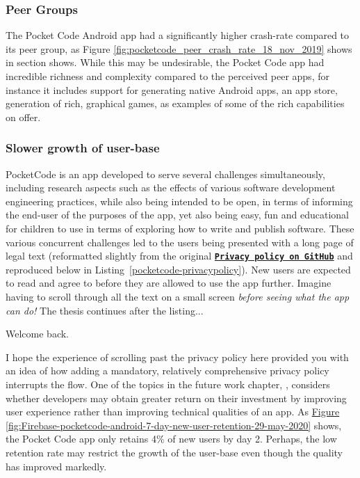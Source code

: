 \subsubsection{Peer Groups}
The Pocket Code Android app had a significantly higher crash-rate compared to its peer group, as Figure \ref{fig:pocketcode_peer_crash_rate_18_nov_2019} shows in section \href{android-vitals-peer-groups}{\emph{}} shows. While this may be undesirable, the Pocket Code app had incredible richness and complexity compared to the perceived peer apps, for instance it includes support for generating native Android apps, an app store, generation of rich, graphical games, as examples of some of the rich capabilities on offer.


\subsubsection{Slower growth of user-base}
PocketCode is an app developed to serve several challenges simultaneously, including research aspects such as the effects of various software development engineering practices, while also being intended to be open, in terms of informing the end-user of the purposes of the app, yet also being easy, fun and educational for children to use in terms of exploring how to write and publish software. These various concurrent challenges led to the users being presented with a long page of legal text (reformatted slightly from the original \href{https://github.com/Catrobat/Catroid/blob/develop/catroid/src/main/res/values/strings.xml}{\textbf{\texttt{Privacy policy on GitHub}}} and reproduced below in Listing~\ref{pocketcode-privacypolicy}). New users are expected to read and agree to before they are allowed to use the app further. Imagine having to scroll through all the text on a small screen \emph{before seeing what the app can do!} The thesis continues after the listing...



Welcome back. 

I hope the experience of scrolling past the privacy policy here provided you with an idea of how adding a mandatory, relatively comprehensive privacy policy interrupts the flow. One of the topics in the future work chapter, \href{enhancing-quality-vs-enhancing-ux}{\textit{}}, considers whether developers may obtain greater return on their investment by improving user experience rather than improving technical qualities of an app. As \href{enhancing-quality-vs-enhancing-ux}{Figure \ref{fig:Firebase-pocketcode-android-7-day-new-user-retention-29-may-2020}} shows, the Pocket Code app only retains 4\% of new users by day 2. Perhaps, the low retention rate may restrict the growth of the user-base even though the quality has improved markedly.

